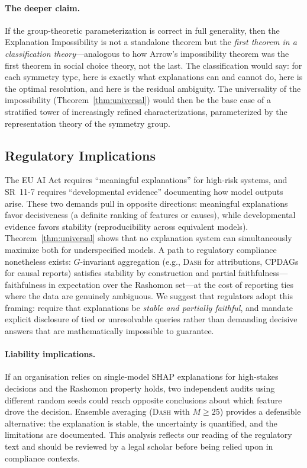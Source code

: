 \documentclass[11pt,a4paper]{article}
\newcommand{\DASH}{\textsc{Dash}}
\begin{document}
\paragraph{The deeper claim.}
If the group-theoretic parameterization is correct in full generality, then
the Explanation Impossibility is not a standalone theorem but the \emph{first
theorem in a classification theory}---analogous to how Arrow's impossibility
theorem \citep{arrow1951social} was the first theorem in social choice theory,
not the last.  The classification would say: for each symmetry type, here is
exactly what explanations can and cannot do, here is the optimal resolution,
and here is the residual ambiguity.  The universality of the impossibility
(Theorem~\ref{thm:universal}) would then be the base case of a stratified
tower of increasingly refined characterizations, parameterized by the
representation theory of the symmetry group.

\subsection{Regulatory Implications}
\label{sec:regulatory}

The EU AI Act \citep{euaiact2024} requires ``meaningful explanations'' for
high-risk systems, and SR~11-7 \citep{occ2011sr117} requires ``developmental
evidence'' documenting how model outputs arise.  These two demands pull in
opposite directions: meaningful explanations favor decisiveness (a definite
ranking of features or causes), while developmental evidence favors stability
(reproducibility across equivalent models).  Theorem~\ref{thm:universal} shows
that no explanation system can simultaneously maximize both for underspecified
models.  A path to regulatory compliance nonetheless exists: $G$-invariant
aggregation (e.g., \DASH{} for attributions, CPDAGs for causal reports)
satisfies stability by construction and partial faithfulness---faithfulness in
expectation over the Rashomon set---at the cost of reporting ties where the
data are genuinely ambiguous.  We suggest that regulators adopt this framing:
require that explanations be \emph{stable and partially faithful}, and mandate
explicit disclosure of tied or unresolvable queries rather than demanding
decisive answers that are mathematically impossible to guarantee.

\paragraph{Liability implications.}
If an organisation relies on single-model SHAP explanations for high-stakes decisions and the Rashomon property holds, two independent audits using different random seeds could reach opposite conclusions about which feature drove the decision. Ensemble averaging (\DASH{} with $M \geq 25$) provides a defensible alternative: the explanation is stable, the uncertainty is quantified, and the limitations are documented. This analysis reflects our reading of the regulatory text and should be reviewed by a legal scholar before being relied upon in compliance contexts.
\end{document}
